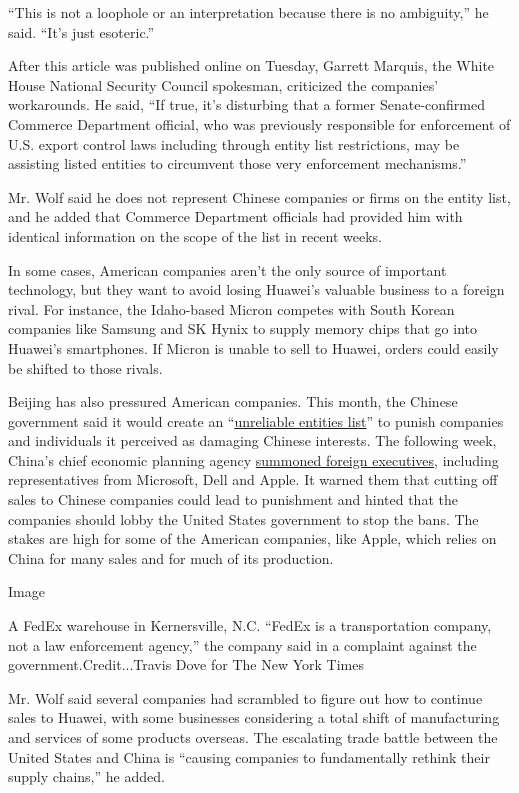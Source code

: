 ``This is not a loophole or an interpretation because there is no
ambiguity,'' he said. ``It's just esoteric.''

After this article was published online on Tuesday, Garrett Marquis, the
White House National Security Council spokesman, criticized the
companies' workarounds. He said, ``If true, it's disturbing that a
former Senate-confirmed Commerce Department official, who was previously
responsible for enforcement of U.S. export control laws including
through entity list restrictions, may be assisting listed entities to
circumvent those very enforcement mechanisms.''

Mr. Wolf said he does not represent Chinese companies or firms on the
entity list, and he added that Commerce Department officials had
provided him with identical information on the scope of the list in
recent weeks.

In some cases, American companies aren't the only source of important
technology, but they want to avoid losing Huawei's valuable business to
a foreign rival. For instance, the Idaho-based Micron competes with
South Korean companies like Samsung and SK Hynix to supply memory chips
that go into Huawei's smartphones. If Micron is unable to sell to
Huawei, orders could easily be shifted to those rivals.

Beijing has also pressured American companies. This month, the Chinese
government said it would create an
``\href{https://www.nytimes.com/2019/05/31/business/china-list-us-huawei-retaliate.html?action=click\&module=inline\&pgtype=Homepage}{unreliable
entities list}'' to punish companies and individuals it perceived as
damaging Chinese interests. The following week, China's chief economic
planning agency
\href{https://www.nytimes.com/2019/06/08/business/economy/china-huawei-trump.html}{summoned
foreign executives}, including representatives from Microsoft, Dell and
Apple. It warned them that cutting off sales to Chinese companies could
lead to punishment and hinted that the companies should lobby the United
States government to stop the bans. The stakes are high for some of the
American companies, like Apple, which relies on China for many sales and
for much of its production.

Image

A FedEx warehouse in Kernersville, N.C. ``FedEx is a transportation
company, not a law enforcement agency,'' the company said in a complaint
against the government.Credit...Travis Dove for The New York Times

Mr. Wolf said several companies had scrambled to figure out how to
continue sales to Huawei, with some businesses considering a total shift
of manufacturing and services of some products overseas. The escalating
trade battle between the United States and China is ``causing companies
to fundamentally rethink their supply chains,'' he added.

